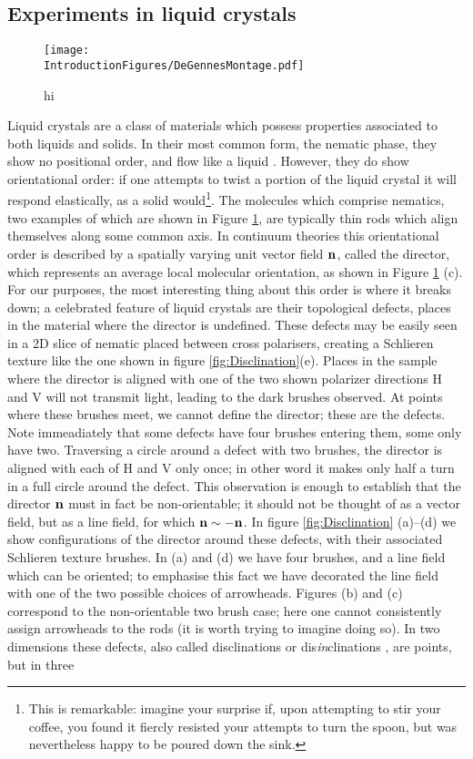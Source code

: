 \subsection{Experiments in liquid crystals}

\begin{figure}[htbp]
\centering
\texttt{[image: \\IntroductionFigures/DeGennesMontage.pdf]}
\caption{hi }
\label{fig:DeGennesMontage}
\end{figure}

Liquid crystals are a class of materials which possess properties associated to both liquids and solids. In their most common form, the nematic phase, they show no positional order, and flow like a liquid \cite{DeGennes}. However, they do show orientational order: if one attempts to twist a portion of the liquid crystal it will respond elastically, as a solid would\footnote{This is remarkable: imagine your surprise if, upon attempting to stir your coffee, you found it fiercly resisted your attempts to turn the spoon, but was nevertheless happy to be poured down the sink.}. The molecules which comprise nematics, two examples of which are shown in Figure \ref{fig:DeGennesMontage}, are typically thin rods which align themselves along some common axis. In continuum theories this orientational order is described by a spatially varying unit vector field $\bf n$, called the director, which represents an average local molecular orientation, as shown in Figure \ref{fig:DeGennesMontage} (c). For our purposes, the most interesting thing about this order is where it breaks down; a celebrated feature of liquid crystals are their topological defects, places in the material where the director is undefined. These defects may be easily seen in a 2D slice of nematic placed between cross polarisers, creating a Schlieren texture \cite{DeGennes} like the one shown in figure \ref{fig:Disclination}(e). Places in the sample where the director is aligned with one of the two shown polarizer directions H and V will not transmit light, leading to the dark brushes observed. At points where these brushes meet, we cannot define the director; these are the defects. Note immeadiately that some defects have four brushes entering them, some only have two. Traversing a circle around a defect with two brushes, the director is aligned with each of H and V only once; in other word it makes only half a turn in a full circle around the defect. This observation is enough to establish that the director $\bf{n}$ must in fact be non-orientable; it should not be thought of as a vector field, but as a line field, for which $\bf n \sim - \bf n$. In figure \ref{fig:Disclination} (a)--(d) we show configurations of the director around these defects, with their associated Schlieren texture brushes. In (a) and (d) we have four brushes, and a line field which can be oriented; to emphasise this fact we have decorated the line field with one of the two possible choices of arrowheads. Figures (b) and (c) correspond to the non-orientable two brush case; here one cannot consistently assign arrowheads to the rods (it is worth trying to imagine doing so). In two dimensions these defects, also called disclinations or dis\emph{in}clinations \cite{Frank}, are points, but in three 